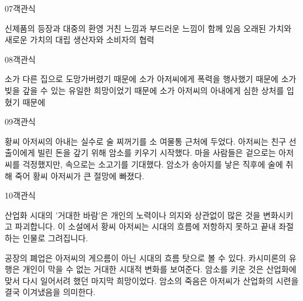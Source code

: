 \documentclass[fs95,seriesFre]{korfarm-base}
\begin{document}
\begin{kfQBlock}{07}{객관식}
\begin{kfChoices}
\kfChoice 신제품의 등장과 대중의 환영
\kfChoice 거친 느낌과 부드러운 느낌이 함께 있음
\kfChoice 오래된 가치와 새로운 가치의 대립
\kfChoice 생산자와 소비자의 협력
\end{kfChoices}
\end{kfQBlock}

\begin{kfQBlock}{08}{객관식}
\begin{kfChoices}
\kfChoice 소가 다른 집으로 도망가버렸기 때문에
\kfChoice 소가 아저씨에게 폭력을 행사했기 때문에
\kfChoice 소가 빚을 갚을 수 있는 유일한 희망이었기 때문에
\kfChoice 소가 아저씨의 아내에게 심한 상처를 입혔기 때문에
\end{kfChoices}
\end{kfQBlock}

\begin{kfQBlock}{09}{객관식}
\begin{kfChoices}
\kfChoice 황씨 아저씨의 아내는 실수로 술 찌꺼기를 소 여물통 근처에 두었다.
\kfChoice 아저씨는 친구 선출이에게 빌린 돈을 갚기 위해 암소를 키우기 시작했다.
\kfChoice 마을 사람들은 겉으로는 아저씨를 걱정했지만, 속으로는 소고기를 기대했다.
\kfChoice 암소가 송아지를 낳은 직후에 술에 취해 죽어 황씨 아저씨가 큰 절망에 빠졌다.
\end{kfChoices}
\end{kfQBlock}

\begin{kfQBlock}{10}{객관식}
\begin{kfEvidence}산업화 시대의 '거대한 바람'은 개인의 노력이나 의지와 상관없이 많은 것을 변화시키고 파괴합니다. 이 소설에서 황씨 아저씨는 시대의 흐름에 저항하지 못하고 끝내 좌절하는 인물로 그려집니다.\end{kfEvidence}
\begin{kfChoices}
\kfChoice 공장의 폐업은 아저씨의 게으름이 아닌 시대의 흐름 탓으로 볼 수 있다.
\kfChoice 카시미론의 유행은 개인이 막을 수 없는 거대한 시대적 변화를 보여준다.
\kfChoice 암소를 키운 것은 산업화에 맞서 다시 일어서려 했던 마지막 희망이었다.
\kfChoice 암소의 죽음은 아저씨가 산업화의 시련을 결국 이겨냈음을 의미한다.
\end{kfChoices}
\end{kfQBlock}
\end{document}
